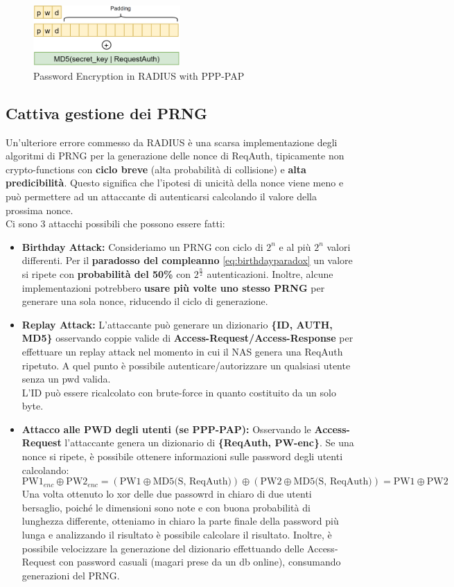 \begin{figure}[h]
    \centering
    \includegraphics[width=0.5\textwidth]{image/radpwdenc.png}
    \caption{Password Encryption in RADIUS with PPP-PAP}
    \label{fig:radpwdenc}
\end{figure}
\subsection{Cattiva gestione dei PRNG}
Un'ulteriore errore commesso da RADIUS è una scarsa implementazione degli algoritmi di PRNG per la generazione delle nonce di ReqAuth, tipicamente non crypto-functions con \textbf{ciclo breve} (alta probabilità di collisione) e \textbf{alta predicibilità}. Questo significa che l'ipotesi di unicità della nonce viene meno e può permettere ad un attaccante di autenticarsi calcolando il valore della prossima nonce.\\
Ci sono 3 attacchi possibili che possono essere fatti:
\begin{itemize}
    \item \textbf{Birthday Attack:} Consideriamo un PRNG con ciclo di $2^n$ e al più $2^n$ valori differenti. Per il \textbf{paradosso del compleanno} \cref{eq:birthdayparadox} un valore si ripete con \textbf{probabilità del 50\%} con $2^\frac{n}{2}$ autenticazioni. Inoltre, alcune implementazioni potrebbero \textbf{usare più volte uno stesso PRNG} per generare una sola nonce, riducendo il ciclo di generazione.
    \item \textbf{Replay Attack:} L'attaccante può generare un dizionario \textbf{\{ID, AUTH, MD5\}} osservando coppie valide di \textbf{Access-Request/Access-Response} per effettuare un replay attack nel momento in cui il NAS genera una ReqAuth ripetuto. A quel punto è possibile autenticare/autorizzare un qualsiasi utente senza un pwd valida.\\
    L'ID può essere ricalcolato con brute-force in quanto costituito da un solo byte.
    \item \textbf{Attacco alle PWD degli utenti (se PPP-PAP):} Osservando le \textbf{Access-Request} l'attaccante genera un dizionario di \textbf{\{ReqAuth, PW-enc\}}. Se una nonce si ripete, è possibile ottenere informazioni sulle password degli utenti calcolando:
    \[\text{PW1}_{enc}\oplus\text{PW2}_{enc}=(\text{PW1}\oplus\text{MD5(S, ReqAuth)})\oplus(\text{PW2}\oplus\text{MD5(S, ReqAuth)})=\text{PW1}\oplus\text{PW2}\]
    Una volta ottenuto lo xor delle due passowrd in chiaro di due utenti bersaglio, poiché le dimensioni sono note e con buona probabilità di lunghezza differente, otteniamo in chiaro la parte finale della password più lunga e analizzando il risultato è possibile calcolare il risultato. Inoltre, è possibile velocizzare la generazione del dizionario effettuando delle Access-Request con password casuali (magari prese da un db online), consumando generazioni del PRNG.
\end{itemize}
\pagebreak
